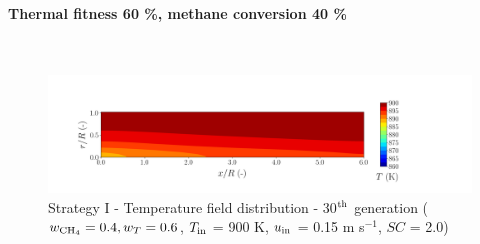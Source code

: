 \documentclass[preprint,12pt]{elsarticle}
\begin{document}



\clearpage



\paragraph{Thermal fitness 60 \%, methane conversion 40 \%} \hspace{0pt} \\
\noindent 


%

\begin{figure}[h!]
\centering
\includegraphics[width=190mm]{results/5/40C_60T/GEN30-TFIELD.png}
\caption{\label{fig:5R4060G30-TField} Strategy I - Temperature field distribution - 30$^{\rm{th}}$ generation ($w_{\rm{CH_4}} = 0.4, w_T = 0.6$, $T_{\rm{in}}$ = 900 K, $u_{\rm{in}}$ = 0.15 m s$^{-1}$, $SC$ = 2.0)}
\end{figure}
\end{document}

